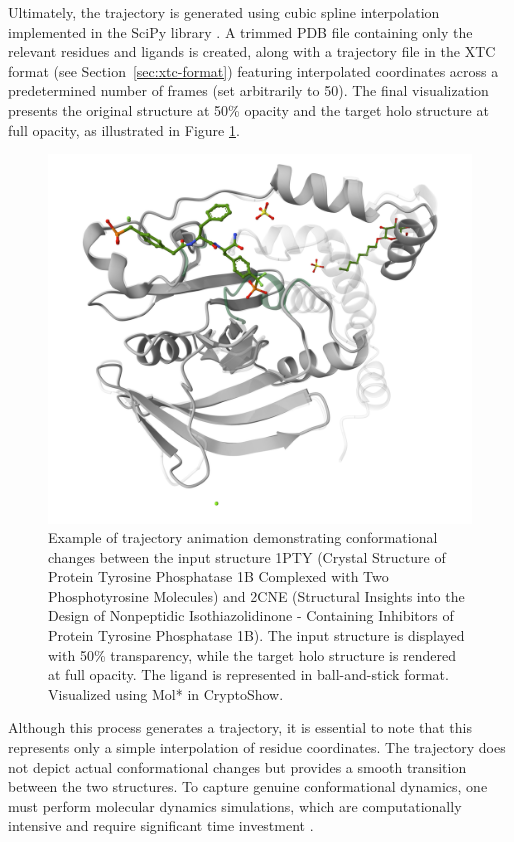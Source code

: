 Ultimately, the trajectory is generated using cubic spline interpolation \cite{mckinley1998cubic} implemented in the SciPy library \cite{virtanen2020scipy}. A trimmed PDB file containing only the relevant residues and ligands is created, along with a trajectory file in the XTC format (see Section~\ref{sec:xtc-format}) featuring interpolated coordinates across a predetermined number of frames (set arbitrarily to 50). The final visualization presents the original structure at 50\% opacity and the target holo structure at full opacity, as illustrated in Figure \ref{fig:trajectory-animation}.

\begin{figure}[htbp]
    \centering
    \includegraphics[width=\textwidth]{img/trajectory_animation.png}
    \caption{Example of trajectory animation demonstrating conformational changes between the input structure 1PTY (Crystal Structure of Protein Tyrosine Phosphatase 1B Complexed with Two Phosphotyrosine Molecules) and 2CNE (Structural Insights into the Design of Nonpeptidic Isothiazolidinone - Containing Inhibitors of Protein Tyrosine Phosphatase 1B). The input structure is displayed with 50\% transparency, while the target holo structure is rendered at full opacity. The ligand is represented in ball-and-stick format. Visualized using Mol* in CryptoShow.}
    \label{fig:trajectory-animation}
\end{figure}

Although this process generates a trajectory, it is essential to note that this represents only a simple interpolation of residue coordinates. The trajectory does not depict actual conformational changes but provides a smooth transition between the two structures. To capture genuine conformational dynamics, one must perform molecular dynamics simulations, which are computationally intensive and require significant time investment \cite{schlitter1993targeted}.


